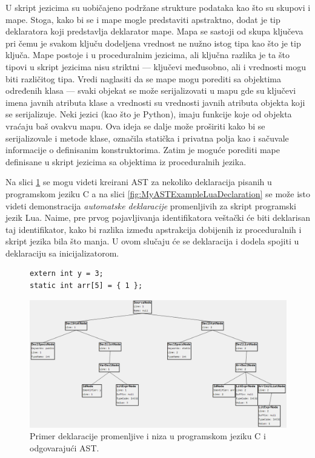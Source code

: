 U skript jezicima su uobičajeno podržane strukture podataka kao što su skupovi i mape. Stoga, kako bi se i mape mogle predstaviti apstraktno, dodat je tip deklaratora koji predstavlja deklarator mape. Mapa se sastoji od skupa ključeva pri čemu je svakom ključu dodeljena vrednost ne nužno istog tipa kao što je tip ključa. Mape postoje i u proceduralnim jezicima, ali ključna razlika je ta što tipovi u skript jezicima nisu striktni --- ključevi međusobno, ali i vrednosti mogu biti različitog tipa. Vredi naglasiti da se mape mogu porediti sa objektima određenih klasa --- svaki objekat se može serijalizovati u mapu gde su ključevi imena javnih atributa klase a vrednosti su vrednosti javnih atributa objekta koji se serijalizuje. Neki jezici (kao što je Python), imaju funkcije koje od objekta vraćaju baš ovakvu mapu. Ova ideja se dalje može proširiti kako bi se serijalizovale i metode klase, označila statička i privatna polja kao i sačuvale informacije o definisanim konstruktorima. Zatim je moguće porediti mape definisane u skript jezicima sa objektima iz proceduralnih jezika.

Na slici \ref{fig:MyASTExampleCDeclaration} se mogu videti kreirani AST za nekoliko deklaracija pisanih u programskom jeziku C a na slici \ref{fig:MyASTExampleLuaDeclaration} se može isto videti demonstracija \emph{automatske deklaracije} promenljivih za skript programski jezik Lua. Naime, pre prvog pojavljivanja identifikatora veštački će biti deklarisan taj identifikator, kako bi razlika između apstrakcija dobijenih iz proceduralnih i skript jezika bila što manja. U ovom slučaju će se deklaracija i dodela spojiti u deklaraciju sa inicijalizatorom.

\begin{figure}[h!]
\begin{lstlisting}
extern int y = 3;
static int arr[5] = { 1 };
\end{lstlisting}
\centering
\includegraphics[scale=0.48]{images/c_ast_decl2.png}
\caption{Primer deklaracije promenljive i niza u programskom jeziku C i odgovarajući AST.}
\label{fig:MyASTExampleCDeclaration}
\end{figure}

